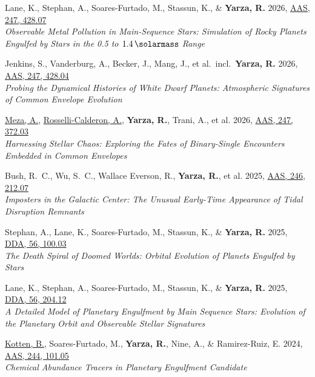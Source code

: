 \item Lane, K., Stephan, A., Soares-Furtado, M., Stassun, K., \& \textbf{Yarza, R.} 2026, \href{https://ui.adsabs.harvard.edu/abs/2026AAS...24742807L}{AAS, 247, 428.07}\\\textit{Observable Metal Pollution in Main-Sequence Stars: Simulation of Rocky Planets Engulfed by Stars in the 0.5 to \( \qty{1.4}{\solarmass} \) Range}

\item Jenkins, S., Vanderburg, A., Becker, J., Mang, J., et al.\ incl.\ \textbf{Yarza, R.} 2026, \href{https://ui.adsabs.harvard.edu/abs/2026AAS...24742804J}{AAS, 247, 428.04}\\\textit{Probing the Dynamical Histories of White Dwarf Planets: Atmospheric Signatures of Common Envelope Evolution}

\item \underline{Meza, A.}, \underline{Rosselli-Calderon, A.}, \textbf{Yarza, R.}, Trani, A., et al. 2026, \href{https://ui.adsabs.harvard.edu/abs/2026AAS...24737203M}{AAS, 247, 372.03}\\\textit{Harnessing Stellar Chaos: Exploring the Fates of Binary-Single Encounters Embedded in Common Envelopes}

\item Bush, R.~C., Wu, S.~C., Wallace Everson, R., \textbf{Yarza, R.}, et al. 2025, \href{https://ui.adsabs.harvard.edu/abs/2025AAS...24621207B}{AAS, 246, 212.07}\\\textit{Imposters in the Galactic Center: The Unusual Early-Time Appearance of Tidal Disruption Remnants}

\item Stephan, A., Lane, K., Soares-Furtado, M., Stassun, K., \& \textbf{Yarza, R.} 2025, \href{https://ui.adsabs.harvard.edu/abs/2025DDA....5610003S}{DDA, 56, 100.03}\\\textit{The Death Spiral of Doomed Worlds: Orbital Evolution of Planets Engulfed by Stars}

\item Lane, K., Stephan, A., Soares-Furtado, M., Stassun, K., \& \textbf{Yarza, R.} 2025, \href{https://ui.adsabs.harvard.edu/abs/2025DDA....5620412L}{DDA, 56, 204.12}\\\textit{A Detailed Model of Planetary Engulfment by Main Sequence Stars: Evolution of the Planetary Orbit and Observable Stellar Signatures}

\item \underline{Kotten, B.}, Soares-Furtado, M., \textbf{Yarza, R.}, Nine, A., \& Ramirez-Ruiz, E. 2024, \href{https://ui.adsabs.harvard.edu/abs/2024AAS...24410105K}{AAS, 244, 101.05}\\\textit{Chemical Abundance Tracers in Planetary Engulfment Candidate}


